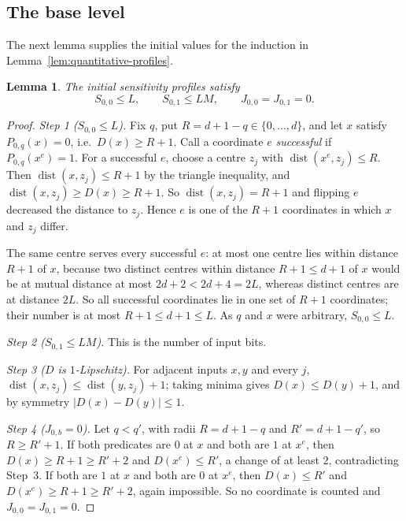 \documentclass[11pt]{article}
\newcommand{\dist}{\operatorname{dist}}
\newtheorem{lemma}[theorem]{Lemma}
\theoremstyle{definition}
\theoremstyle{remark}
\begin{document}
\subsection{The base level}

The next lemma supplies the initial values for the induction in
Lemma~\ref{lem:quantitative-profiles}.

\begin{lemma}\label{lem:base}
The initial sensitivity profiles satisfy
\begin{equation}\label{eq:base-profile}
 S_{0,0}\le L,\qquad S_{0,1}\le LM,\qquad
 J_{0,0}=J_{0,1}=0.
\end{equation}
\end{lemma}
\begin{proof}
\emph{Step 1 (\(S_{0,0}\le L\)).} Fix \(q\), put \(R=d+1-q\in\{0,\ldots,d\}\),
and let \(x\) satisfy \(P_{0,q}(x)=0\), i.e.\ \(D(x)\ge R+1\). Call a
coordinate \(e\) \emph{successful} if \(P_{0,q}(x^e)=1\). For a successful
\(e\), choose a centre \(z_j\) with \(\dist(x^e,z_j)\le R\). Then
\(\dist(x,z_j)\le R+1\) by the triangle inequality, and
\(\dist(x,z_j)\ge D(x)\ge R+1\). So \(\dist(x,z_j)=R+1\) and flipping \(e\)
decreased the distance to \(z_j\). Hence \(e\) is one of the \(R+1\)
coordinates in which \(x\) and \(z_j\) differ.

The same centre serves every successful \(e\): at most one centre lies
within distance \(R+1\) of \(x\), because two distinct centres within
distance \(R+1\le d+1\) of \(x\) would be at mutual distance at most
\(2d+2<2d+4=2L\), whereas distinct centres are at distance \(2L\). So all
successful coordinates lie in one set of \(R+1\) coordinates; their number
is at most \(R+1\le d+1\le L\). As \(q\) and \(x\) were arbitrary,
\(S_{0,0}\le L\).

\emph{Step 2 (\(S_{0,1}\le LM\)).} This is the number of input bits.

\emph{Step 3 (\(D\) is \(1\)-Lipschitz).} For adjacent inputs \(x,y\) and
every \(j\), \(\dist(x,z_j)\le\dist(y,z_j)+1\); taking minima gives
\(D(x)\le D(y)+1\), and by symmetry \(|D(x)-D(y)|\le1\).

\emph{Step 4 (\(J_{0,b}=0\)).} Let \(q<q'\), with radii
\(R=d+1-q\) and \(R'=d+1-q'\), so \(R\ge R'+1\). If both predicates are \(0\)
at \(x\) and both are \(1\) at \(x^e\), then \(D(x)\ge R+1\ge R'+2\) and
\(D(x^e)\le R'\), a change of at least \(2\), contradicting Step~3. If both
are \(1\) at \(x\) and both are \(0\) at \(x^e\), then \(D(x)\le R'\) and
\(D(x^e)\ge R+1\ge R'+2\), again impossible. So no coordinate is counted and
\(J_{0,0}=J_{0,1}=0\).
\end{proof}
\end{document}
